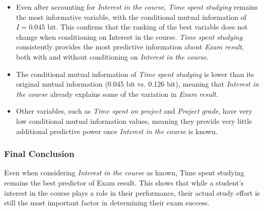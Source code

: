 \documentclass{article}
\begin{document}
\begin{itemize} 
    \item Even after accounting for \textit{Interest in the course}, \textit{Time spent studying} remains the most informative variable, with the conditional mutual information of $I = 0.045 \mbox{ bit}$. This confirms that the ranking of the best variable does not change when conditioning on Interest in the course. \textit{Time spent studying} consistently provides the most predictive information about \textit{Exam result}, both with and without conditioning on \textit{Interest in the course}. 
    \item The conditional mutual information of \textit{Time spent studying} is lower than its original mutual information (0.045 bit vs. 0.126 bit), meaning that \textit{Interest in the course} already explains some of the variation in \textit{Exam result}. 
    \item Other variables, such as \textit{Time spent on project} and \textit{Project grade}, have very low conditional mutual information values, meaning they provide very little additional predictive power once \textit{Interest in the course} is known. 
\end{itemize}

\subsubsection*{Final Conclusion}

Even when considering \textit{Interest in the course} as known, Time spent studying remains the best predictor of Exam result. This shows that while a student's interest in the course plays a role in their performance, their actual study effort is still the most important factor in determining their exam success.
\end{document}
